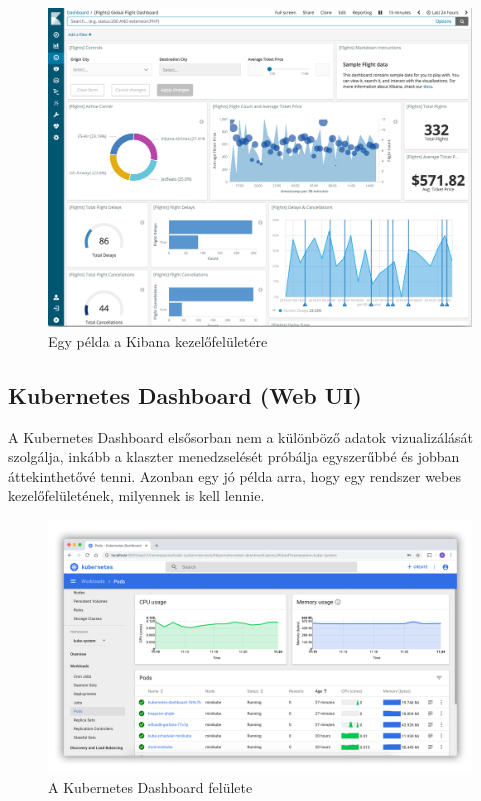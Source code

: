 \begin{figure}[!ht]
    \centering
    \includegraphics[width=150mm, keepaspectratio]{figures/kibana-dashboard.png}
    \caption{Egy példa a Kibana kezelőfelületére}
    \label{fig:kibana}
\end{figure}

\subsection{Kubernetes Dashboard (Web UI)}
A Kubernetes Dashboard \cite{kubernetes-dashboard} elsősorban nem a különböző adatok vizualizálását szolgálja, inkább a klaszter menedzselését próbálja egyszerűbbé és jobban áttekinthetővé tenni.
Azonban egy jó példa arra, hogy egy rendszer webes kezelőfelületének, milyennek is kell lennie.

\begin{figure}[!ht]
    \centering
    \includegraphics[width=150mm, keepaspectratio]{figures/kubernetes-dashboard.png}
    \caption{A Kubernetes Dashboard felülete}
    \label{fig:kibana}
\end{figure}